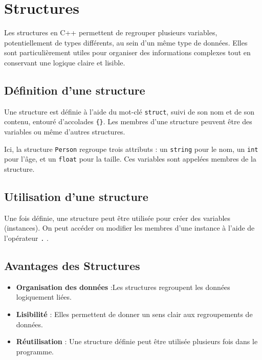 \chapter{Structures}

Les structures en C++ permettent de regrouper plusieurs variables, potentiellement de types différents, au sein d’un même type de données. Elles sont particulièrement utiles pour organiser des informations complexes tout en conservant une logique claire et lisible.

\section{Définition d'une structure}

Une structure est définie à l'aide du mot-clé \lstinline|struct|, suivi de son nom et de son contenu, entouré d’accolades \lstinline|{}|. Les membres d'une structure peuvent être des variables ou même d'autres structures.



Ici, la structure \lstinline|Person| regroupe trois attributs : un \lstinline|string| pour le nom, un \lstinline|int| pour l'âge, et un \lstinline|float| pour la taille. Ces variables sont appelées membres de la structure.

\section{Utilisation d'une structure}

Une fois définie, une structure peut être utilisée pour créer des variables (instances). On peut accéder ou modifier les membres d'une instance à l’aide de l’opérateur \lstinline|.| .



\section{Avantages des Structures}

\begin{itemize}
	\item \textbf{Organisation des données} :Les structures regroupent les données logiquement liées.
	\item \textbf{Lisibilité} : Elles permettent de donner un sens clair aux regroupements de données.
	\item \textbf{Réutilisation} : Une structure définie peut être utilisée plusieurs fois dans le programme.
\end{itemize}